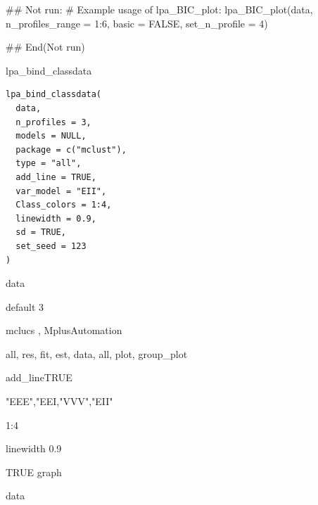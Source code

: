 \documentclass[a4paper]{book}
\begin{document}
%
\begin{Examples}
\begin{ExampleCode}
## Not run: 
# Example usage of lpa_BIC_plot:
lpa_BIC_plot(data, n_profiles_range = 1:6, basic = FALSE, set_n_profile = 4)

## End(Not run)
\end{ExampleCode}
\end{Examples}
%
\begin{Description}
lpa\_bind\_classdata
\end{Description}
%
\begin{Usage}
\begin{verbatim}
lpa_bind_classdata(
  data,
  n_profiles = 3,
  models = NULL,
  package = c("mclust"),
  type = "all",
  add_line = TRUE,
  var_model = "EII",
  Class_colors = 1:4,
  linewidth = 0.9,
  sd = TRUE,
  set_seed = 123
)
\end{verbatim}
\end{Usage}
%
\begin{Arguments}
\begin{ldescription}
\item[\code{data}] data

\item[\code{n\_profiles}] default 3

\item[\code{package}] mclucs , MplusAutomation

\item[\code{type}] all, res, fit, est, data, all, plot, group\_plot

\item[\code{add\_line}] add\_lineTRUE

\item[\code{var\_model}] "EEE","EEI,"VVV","EII"

\item[\code{Class\_colors}] 1:4

\item[\code{linewidth}] linewidth 0.9

\item[\code{sd}] TRUE graph
\end{ldescription}
\end{Arguments}
%
\begin{Value}
data
\end{Value}
%
\end{document}
